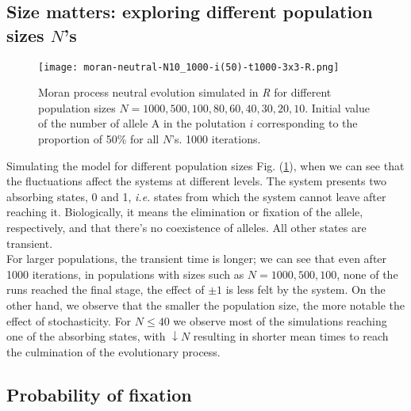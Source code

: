 \documentclass[12pt]{article}
\begin{document}
\subsection{Size matters: exploring different population sizes $N$'s}
\begin{figure}[H]
    \centering
    \texttt{[image: moran-neutral-N10\_1000-i(50)-t1000-3x3-R.png]}
    \caption{Moran process neutral evolution simulated in \textit{R} for different population sizes $N = 1000, 500, 100, 80, 60, 40, 30, 20, 10$. Initial value of the number of allele A in the polutation $i$ corresponding to the proportion of 50\% for all $N$'s. 1000 iterations.}
    \label{fig:diff_sizesN}
\end{figure}
\indent Simulating the model for different population sizes Fig. (\ref{fig:diff_sizesN}), when we can see that the fluctuations affect the systems at different levels. The system presents two absorbing states, 0 and 1, \textit{i.e.} states from which the system cannot leave after reaching it. Biologically, it means the elimination or fixation of the allele, respectively, and that there's no coexistence of alleles. All other states are transient. \\
\indent For larger populations, the transient time is longer; we can see that even after 1000 iterations, in populations with sizes such as $N = 1000, 500, 100$, none of the runs reached the final stage, the effect of $\pm 1$ is less felt by the system. On the other hand, we observe that the smaller the population size, the more notable the effect of stochasticity. For $N \leq 40$ we observe most of the simulations reaching one of the absorbing states, with $\downarrow N$ resulting in shorter mean times to reach the culmination of the evolutionary process.

\subsection{Probability of fixation}
\end{document}
